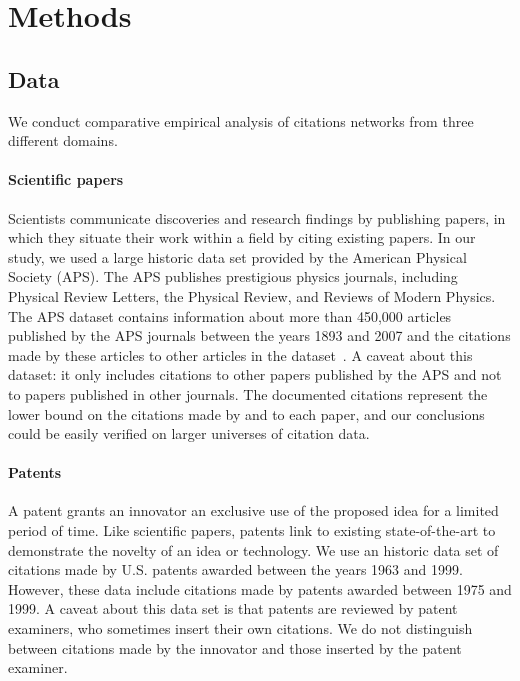 \documentclass[10pt]{bmc_article}
\newenvironment{bmcformat}{\baselineskip20pt\sloppy\setboolean{publ}{false}}{\baselineskip20pt\sloppy}
\begin{document}
\begin{bmcformat}
\section{Methods}
\label{sec:data}

\subsection{Data}
We conduct comparative empirical analysis of citations networks from three different domains.

\paragraph{Scientific papers}
Scientists communicate discoveries and research findings by publishing papers, in which they situate their work within a field by citing existing papers.
In our study, we used a large historic data set provided by the American Physical Society (APS). The APS publishes prestigious physics journals, including Physical Review Letters, the Physical Review, and Reviews of Modern Physics. The APS dataset contains  information about more than 450,000 articles published by the APS journals between the years 1893 and 2007 and the citations made by these articles to other articles in the dataset~\cite{Redner05}. A caveat about this dataset: it only includes citations to other papers published by the APS and not to papers published in other  journals. The documented citations represent the lower bound on the citations made by and to each paper, and our conclusions could be easily verified on larger universes of citation data.


\paragraph{Patents}
A patent grants an innovator an exclusive use of the proposed idea for a limited period of time. Like scientific papers, patents link to existing state-of-the-art to demonstrate the novelty of an idea or technology.
We use an historic data set of citations made by U.S. patents awarded between the years 1963 and 1999. However, these data include citations made by patents awarded between 1975 and 1999. A caveat about this data set is that patents are reviewed by patent examiners, who sometimes insert their own citations. We do not distinguish between citations made by the innovator and those inserted by the patent examiner.


\end{bmcformat}
\end{document}
